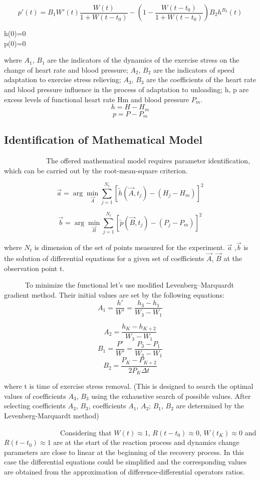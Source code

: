 $$p'(t)=B_{1}W'(t) \frac{W(t)}{1+W(t-t_{0})}-(1-\frac{W(t-t_{0})}{1+W(t-t_{0})})B_{2}h^{B_{3}}(t)$$
\begin{center}
	h(0)=0 \\
	p(0)=0\\	
\end{center}
where $A_{1}$, $B_{1}$ are the indicators of the dynamics of the exercise stress on the change of heart rate and blood pressure; $A_{2}$, $B_{2}$ are the indicators of speed adaptation to exercise stress relieving; $A_{3}$, $B_{3}$ are the coefficients of the heart rate and blood pressure influence in the process of adaptation to unloading; h, p are excess levels of functional heart rate Hm and blood pressure $P_{m}$.
$$h=H-H_{m}$$
$$p=P-P_{m}$$

\subsection*{Identification of Mathematical Model}
\par ~~~~~~~~~~~~The offered mathematical model requires parameter identification, which can be carried out by the root-mean-square criterion. 

$$\vec{a}=\arg \min_{\vec{A}}\sum_{j=1}^{N_{t}}[\tilde{h}(\vec{A},t_{j})-(H_{j}-H_{m})]^{2}$$

$$\vec{b}=\arg \min_{\vec{B}}\sum_{j=1}^{N_{t}}[\tilde{p}(\vec{B},t_{j
})-(P_{j}-P_{m})]^{2}$$

where $N_{t}$ is dimension of the set of points measured for the experiment. $\vec{a}$ ,$\vec{b}$ is the solution of differential equations for a given set of coefficients $\vec{A}$, $\vec{B}$ at the observation
point t.
\par ~~~~~~To minimize the functional let’s use modified Levenberg–Marquardt gradient method. Their initial values
are set by the following equations:
$$A_{1}=\frac{h'}{W'}=\frac{h_{3}-h_{1}}{W_{3}-W_{1}}$$

$$A_{2}=\frac{h_{K}-h_{K+2}}{W_{3}-W_{1}}$$
$$B_{1}=\frac{P'}{W'}=\frac{P_{3}-P_{1}}{W_{3}-W_{1}}$$
$$B_{2}=\frac{P_{K}-P_{K+2}}{2P_{K}\Delta t}$$

where t is time of exercise stress removal.
(This is designed to search the optimal values of coefficients $A_{3}$, $B_{3}$ using the exhaustive search of possible values. After selecting coefficients $A_{3}$, $B_{3}$, coefficients $A_{1}$, $A_{2}$; $B_{1}$, $B_{2}$ are determined by the Levenberg-Marquardt method)

\par ~~~~~~~~~~~~~~~~Considering that $W(t)\approx 1$, $R(t-t_{0})\approx 0$, $W(t_{K})\approx 0$ and $R(t-t_{0})\approx 1$ are at the
start of the reaction process and dynamics change parameters are close to linear at the beginning of the recovery process. In this case the differential equations could be simplified and the corresponding values are obtained from the approximation of difference-differential operators ratios.

